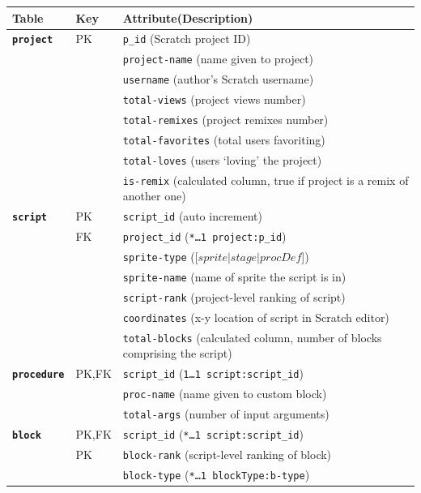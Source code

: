 \documentclass[10pt, conference]{IEEEtran}
\begin{document}
\begin{table}[]
	\centering
	\begin{tabular}{llp{5.4cm}}
		\textbf{Table}& \textbf{Key} & \textbf{Attribute(Description)}\\
		\hline
		\textbf{\texttt{project}} & PK & \texttt{p\_id} (Scratch project ID)\\
		&  & 							\texttt{project-name} (name given to project)\\
		&  & 							\texttt{username} (author's Scratch 
		username)\\
		&  & 							\texttt{total-views} (project views number)\\
		&  & 							\texttt{total-remixes} (project remixes number)\\
		&  & 							\texttt{total-favorites} (total users favoriting)\\
		&  & 							\texttt{total-loves} (users `loving' the project)\\
		& & 							\texttt{is-remix} (calculated column, true if project is a remix of another one)\\
		\hline
		\textbf{\texttt{script}} & PK & \texttt{script\_id} (auto increment)\\
		& FK & 							\texttt{project\_id} (\texttt{\scriptsize{*\ldots1 project:p\_id}})\\
		& & 							\texttt{sprite-type} ([$sprite \vert stage \vert procDef$])\\
		& & 							\texttt{sprite-name} (name of sprite the script is in)\\
		& & 							\texttt{script-rank} (project-level ranking of script)\\
		& & 							\texttt{coordinates} (x-y location of script in Scratch editor)\\
		& & 							\texttt{total-blocks} (calculated column, number of blocks comprising the script)\\
		\hline
		\textbf{\texttt{procedure}} & PK,FK & \texttt{script\_id} (\texttt{\scriptsize{1\ldots1 script:script\_id}})\\
		& & 							\texttt{proc-name} (name given to custom block)\\
		& & 							\texttt{total-args} (number of input arguments)\\
		\hline
		\textbf{\texttt{block}} & PK,FK  & \texttt{script\_id} (\texttt{\scriptsize{*\ldots1 script:script\_id}})\\
		& PK & \texttt{block-rank} (script-level ranking of block)\\
		&  & \texttt{block-type} (\texttt{\scriptsize{*\ldots1 blockType:b-type}})\\

\end{tabular}
\end{table}
\end{document}
